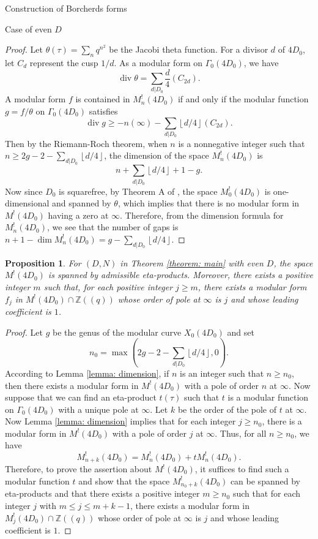 \documentclass{amsart}
\newcounter{lemma}
\newtheorem{Proposition}[lemma]{Proposition}
\theoremstyle{definition}
\def\Z{\mathbb Z}
\def\gauss#1{\left\lfloor #1\right\rfloor}
\def\div{\operatorname{div}}
\begin{document}
\begin{section}{Construction of Borcherds forms}
\begin{subsection}{Case of even $D$}
\begin{proof} Let $\theta(\tau)=\sum_nq^{n^2}$ be the Jacobi theta
  function. For a divisor $d$ of $4D_0$, let $C_d$ represent the cusp
  $1/d$. As a modular form on $\Gamma_0(4D_0)$, we have
  $$
    \div\theta=\sum_{d|D_0}\frac{d}4(C_{2d}).
  $$
  A modular form $f$ is contained in $M^{!}_{n}(4D_0)$ if and only if
  the modular function $g=f/\theta$ on $\Gamma_0(4D_0)$ satisfies
  $$
    \div g\ge -n(\infty)-\sum_{d|D_0}\gauss{d/4}(C_{2d}).
  $$
  Then by the Riemann-Roch theorem, when $n$ is a nonnegative integer
  such that $n\ge 2g-2-\sum_{d|D_0}\gauss{d/4}$, the dimension of the
  space $M^{!}_{n}(4D_0)$ is
  $$
    n+\sum_{d|D_0}\gauss{d/4}+1-g.
  $$
  Now since $D_0$ is squarefree, by Theorem A of \cite{Serre-Stark},
  the space $M_0^!(4D_0)$ is one-dimensional and spanned by
  $\theta$, which implies that there is no modular form in
  $M^!(4D_0)$ having a zero at $\infty$. Therefore, from the dimension
  formula for $M^!_n(4D_0)$, we see that the number of gaps is $n+1-\dim
  M_n^!(4D_0)=g-\sum_{d|D_0}\gauss{d/4}$.
\end{proof}

\begin{Proposition} \label{proposition: admissible span}
  For $(D,N)$ in Theorem \ref{theorem: main} with even $D$, the space
  $M^!(4D_0)$ is spanned by admissible eta-products. Moreover,
  there exists a positive integer $m$ such that, for each positive
  integer $j\ge m$, there exists a modular form $f_j$ in
  $M^!(4D_0)\cap\Z((q))$ whose order of pole at $\infty$ is $j$ and whose
  leading coefficient is $1$.
\end{Proposition}

\begin{proof}
  Let $g$ be the genus of the modular curve $X_0(4D_0)$ and set
  $$
    n_0=\max(2g-2-\sum_{d|D_0}\gauss{d/4},0).
  $$
  According to Lemma \ref{lemma: dimension}, if $n$ is an integer such
  that $n\ge n_0$, then there exists a modular form in $M^!(4D_0)$
  with a pole of order $n$ at $\infty$. Now suppose that we can find
  an eta-product $t(\tau)$ such that $t$ is a modular function on
  $\Gamma_0(4D_0)$ with a unique pole at $\infty$. Let $k$ be the
  order of the pole of $t$ at $\infty$. Now Lemma \ref{lemma:
    dimension} implies that for each integer $j\ge n_0$, there is a
  modular form in $M^!(4D_0)$ with a pole of order $j$ at $\infty$.
  Thus, for all $n\ge n_0$, we have
  $$
    M^!_{n+k}(4D_0)=M^!_n(4D_0)+t M^!_n(4D_0).
  $$
  Therefore, to prove the assertion about $M^!(4D_0)$, it suffices to
  find such a modular function $t$ and show that the space
  $M^!_{n_0+k}(4D_0)$ can be 
  spanned by eta-products and that there exists a positive integer
  $m\ge n_0$ such that for each integer $j$ with $m\le j\le m+k-1$,
  there exists a modular form in $M^!_{j}(4D_0)\cap\Z((q))$ whose
  order of pole at $\infty$ is $j$ and whose leading coefficient is $1$.


\end{proof}
\end{subsection}
\end{section}
\end{document}
